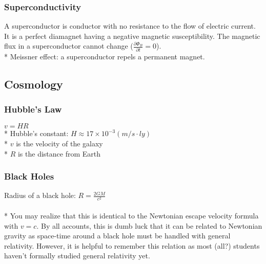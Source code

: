 \subsubsection{Superconductivity}
A superconductor is conductor with no resistance to the flow of electric current.
It is a perfect diamagnet having a negative magnetic susceptibility.
The magnetic flux in a superconductor cannot change (\(\frac{\partial\Phi_B}{\partial t}=0\)).\\*
Meissner effect: a superconductor repels a permanent magnet.

\subsection{Cosmology}

\subsubsection{Hubble's Law}
\(v=HR\)\\*
Hubble's constant: \(H\approx17\times10^{-3} (m/s\cdot ly)\)\\*
\(v\) is the velocity of the galaxy\\*
\(R\) is the distance from Earth

\subsubsection{Black Holes}
Radius of a black hole: \(\displaystyle R=\frac{2GM}{c^2}\)\\\\*
You may realize that this is identical to the Newtonian escape velocity formula with \(v=c\).
By all accounts, this is dumb luck that it can be related to Newtonian gravity as space-time around a black hole must be handled with general relativity.
However, it is helpful to remember this relation as most (all?) students haven't formally studied general relativity yet.
